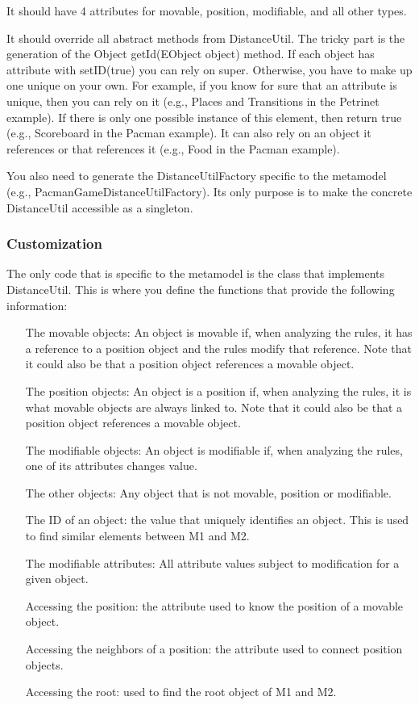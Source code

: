 It should have 4 attributes for movable, position, modifiable, and all other types.

It should override all abstract methods from DistanceUtil.
The tricky part is the generation of the Object getId(EObject object) method. If each object has attribute with setID(true) you can rely on super. Otherwise, you have to make up one unique on your own. For example, if you know for sure that an attribute is unique, then you can rely on it (e.g., Places and Transitions in the Petrinet example). If there is only one possible instance of this element, then return true (e.g., Scoreboard in the Pacman example). It can also rely on an object it references or that references it (e.g., Food in the Pacman example).

You also need to generate the DistanceUtilFactory specific to the metamodel (e.g., PacmanGameDistanceUtilFactory). Its only purpose is to make the concrete DistanceUtil accessible as a singleton.

\subsubsection{Customization}

The only code that is specific to the metamodel is the class that implements DistanceUtil. This is where you define the functions that provide the following information:

\begin{itemize}
	\item[The movable objects:] An object is movable if, when analyzing the rules, it has a reference to a position object and the rules modify that reference. Note that it could also be that a position object references a movable object.
	\item[The position objects:] An object is a position if, when analyzing the rules, it is what movable objects are always linked to. Note that it could also be that a position object references a movable object.
	\item[The modifiable objects:] An object is modifiable if, when analyzing the rules, one of its attributes changes value.
	\item[The other objects:] Any object that is not movable, position or modifiable.
	\item[The ID of an object:] the value that uniquely identifies an object. This is used to find similar elements between M1 and M2.
	\item[The modifiable attributes:] All attribute values subject to modification for a given object.
	\item[Accessing the position:] the attribute used to know the position of a movable object.
	\item[Accessing the neighbors of a position:] the attribute used to connect position objects.
	\item[Accessing the root:] used to find the root object of M1 and M2.
\end{itemize}